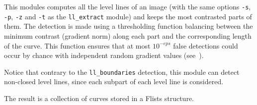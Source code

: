 This modules computes all the level lines of an image 
(with the same options \verb+-s+, \verb+-p+, \verb+-z+ and \verb+-t+ 
as the \verb+ll_extract+ module) and keeps the most contrasted parts of them.
The detection is made using a thresholding function balancing between 
the minimum contrast (gradient norm) along each part and the
corresponding length of the curve. This function ensures
that at most $10^{-eps}$ false detections could occur by chance
with independent random gradient values (see~\cite{desolneux.moisan.ea:edge}).

\medskip

Notice that contrary to the \verb+ll_boundaries+ detection, this 
module can detect non-closed level lines, since each subpart of each
level line is considered.

\medskip

The result is a collection of curves stored in a Flists structure.
